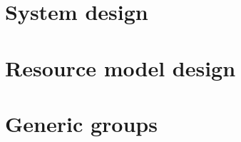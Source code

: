 

\section{System design}


\section{Resource model design} \label{model_design}


\section{Generic groups} \label{generic_groups}
